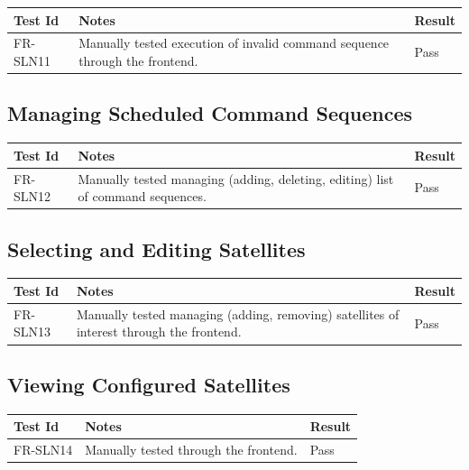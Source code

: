 \documentclass[12pt, titlepage]{article}
\begin{document}
\begin{center}
\begin{tabular}{|p{2cm} | p{8cm} |p{2cm}| }
\hline
\textbf{Test Id} & \textbf{Notes} & \textbf{Result} \\
\hline
FR-SLN11 & Manually tested execution of invalid command sequence through the frontend. & Pass \\
\hline

\end{tabular}
\end{center}

\subsection{Managing Scheduled Command Sequences}

\begin{center}
\begin{tabular}{|p{2cm} | p{8cm} |p{2cm}| }
\hline
\textbf{Test Id} & \textbf{Notes} & \textbf{Result} \\
\hline
FR-SLN12 & Manually tested managing (adding, deleting, editing) list of command sequences. & Pass \\
\hline

\end{tabular}
\end{center}

\subsection{Selecting and Editing Satellites}

\begin{center}
\begin{tabular}{|p{2cm} | p{8cm} |p{2cm}| }
\hline
\textbf{Test Id} & \textbf{Notes} & \textbf{Result} \\
\hline
FR-SLN13 & Manually tested managing (adding, removing) satellites of interest through the frontend. & Pass \\
\hline

\end{tabular}
\end{center}

\subsection{Viewing Configured Satellites}

\begin{center}
\begin{tabular}{|p{2cm} | p{8cm} |p{2cm}| }
\hline
\textbf{Test Id} & \textbf{Notes} & \textbf{Result} \\
\hline
FR-SLN14 & Manually tested through the frontend. & Pass \\
\hline

\end{tabular}
\end{center}
\end{document}
